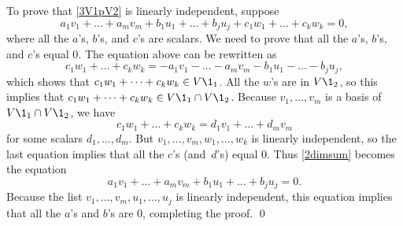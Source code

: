 To prove that \ref{3V1pV2} is linearly independent, suppose
\[
a_1 v_1 + \dots + a_m v_m + b_1 u_1 + \dots + b_j u_j + c_1 w_1 + \dots + c_k w_k = 0,
\]
where all the $a$'s, $b$'s, and $c$'s are scalars.  We need to prove that all the
$a$'s, $b$'s, and $c$'s equal $0$.  The equation above can be rewritten as
\begin{equation} \label{2dimsum}
c_1 w_1 + \dots + c_k w_k =
- a_1 v_1 - \dots - a_m v_m - b_1 u_1 - \dots - b_j u_j,
\end{equation}%
which shows that $c_1 w_1 + \dots + c_k w_k \in V\1_1$.  All the $w$'s are in
$V\1_2$, so  this implies that $c_1 w_1 + \dots + c_k w_k \in V\1_1 \cap V\1_2$.
Because $v_1, \dots, v_m$ is a basis of $V\1_1 \cap V\1_2$, we have
\[
c_1 w_1 + \dots + c_k w_k = d_1 v_1 + \dots + d_m v_m
\]
for some scalars $d_1, \dots, d_m$.  But
$v_1, \dots, v_m, w_1, \dots, w_k$ is linearly independent, so the last
equation implies that all the $c$'s (and~$d$'s) equal $0$.  Thus \ref{2dimsum} becomes the equation
\[
a_1 v_1 + \dots + a_m v_m + b_1 u_1 + \dots + b_j u_j = 0.
\]
Because the list
$v_1, \dots, v_m, u_1, \dots, u_j$ is linearly independent, this equation implies that all the $a$'s and $b$'s are $0$, completing the proof.
\qed

\pagebreak[3]

